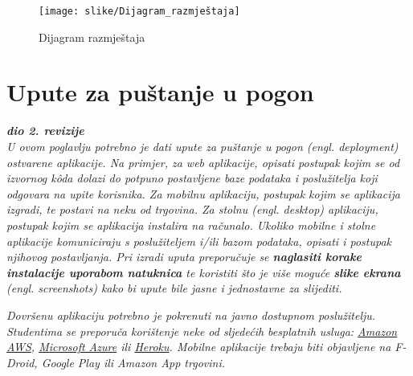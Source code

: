                 \begin{figure}[!htb]
		      \centering
		    \texttt{[image: slike/Dijagram\_razmještaja]}
		      \caption{Dijagram razmještaja}
		      \end{figure}
        
			\eject 
		
		\section{Upute za puštanje u pogon}
		
			\textbf{\textit{dio 2. revizije}}\\
		
			 \textit{U ovom poglavlju potrebno je dati upute za puštanje u pogon (engl. deployment) ostvarene aplikacije. Na primjer, za web aplikacije, opisati postupak kojim se od izvornog kôda dolazi do potpuno postavljene baze podataka i poslužitelja koji odgovara na upite korisnika. Za mobilnu aplikaciju, postupak kojim se aplikacija izgradi, te postavi na neku od trgovina. Za stolnu (engl. desktop) aplikaciju, postupak kojim se aplikacija instalira na računalo. Ukoliko mobilne i stolne aplikacije komuniciraju s poslužiteljem i/ili bazom podataka, opisati i postupak njihovog postavljanja. Pri izradi uputa preporučuje se \textbf{naglasiti korake instalacije uporabom natuknica} te koristiti što je više moguće \textbf{slike ekrana} (engl. screenshots) kako bi upute bile jasne i jednostavne za slijediti.}
			
			
			 \textit{Dovršenu aplikaciju potrebno je pokrenuti na javno dostupnom poslužitelju. Studentima se preporuča korištenje neke od sljedećih besplatnih usluga: \href{https://aws.amazon.com/}{Amazon AWS}, \href{https://azure.microsoft.com/en-us/}{Microsoft Azure} ili \href{https://www.heroku.com/}{Heroku}. Mobilne aplikacije trebaju biti objavljene na F-Droid, Google Play ili Amazon App trgovini.}
			
			
			\eject 